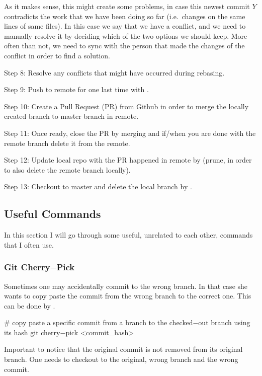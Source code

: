 As it makes sense, this might create some problems, in case this newest commit $Y$ contradicts the work that we have
been doing so far (i.e.\ changes on the same lines of same files). In this case we say that we have a conflict, and we
need to manually resolve it by deciding which of the two options we should keep. More often than not, we need to sync
with the person that made the changes of the conflict in order to find a solution.
\item Step 8: Resolve any conflicts that might have occurred during rebasing.
\item Step 9: Push to remote for one last time with .
\item Step 10: Create a Pull Request (PR) from Github in order to merge the locally created branch to master branch in
remote.
\item Step 11: Once ready, close the PR by merging and if/when you are done with the remote branch delete it from the
remote.
\item Step 12: Update local repo with the PR happened in remote by  (prune, in order to also
delete the remote branch locally).
\item Step 13: Checkout to master and delete the local branch by .
\eit

\subsection{Useful Commands}

In this section I will go through some useful, unrelated to each other, commands that I often use.

\subsubsection{Git Cherry$-$Pick}

Sometimes one may accidentally commit to the wrong branch. In that case she wants to copy paste the commit from the
wrong branch to the correct one. This can be done by .

\begin{bash}
# copy paste a specific commit from a branch to the checked$-$out branch using its hash
git cherry$-$pick <commit_hash>
\end{bash}

Important to notice that the original commit is not removed from its original branch. One needs to checkout to the
original, wrong branch and  the wrong commit.

